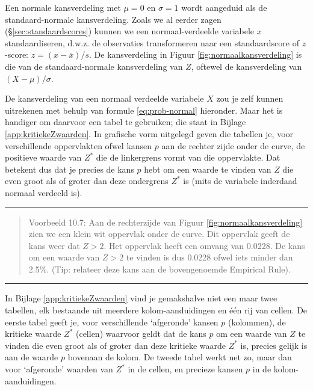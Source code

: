 \documentclass[
]{book}
\begin{document}
Een normale kansverdeling met \(\mu=0\) en \(\sigma=1\) wordt aangeduid als
de standaard-normale kansverdeling. Zoals we al eerder zagen
(§\ref{sec:standaardscores}) kunnen we een normaal-verdeelde
variabele \(x\) standaardiseren, d.w.z. de observaties transformeren naar
een standaardscore of \(z\)-score: \(z = (x-\overline{x})/s\).
De kansverdeling in
Figuur \ref{fig:normaalkansverdeling} is die van de standaard-normale
kansverdeling van \(Z\), oftewel de kansverdeling van \((X-\mu)/\sigma\).

De kansverdeling van een normaal verdeelde variabele \(X\) zou je zelf
kunnen uitrekenen met behulp van formule
\eqref{eq:prob-normal} hieronder. Maar het is handiger om daarvoor
een tabel te gebruiken; die staat in
Bijlage \ref{app:kritiekeZwaarden}.
In grafische vorm uitgelegd geven die tabellen je,
voor verschillende oppervlakten ofwel kansen \(p\) aan de rechter zijde onder de curve,
de positieve waarde van \(Z^*\) die de linkergrens vormt
van die oppervlakte. Dat betekent dus dat je precies de kans \(p\) hebt om
een waarde te vinden van \(Z\) die even groot als of groter dan deze
ondergrens \(Z^*\) is (mits de variabele inderdaad normaal verdeeld is).

\begin{center}\rule{0.5\linewidth}{0.5pt}\end{center}

\begin{quote}
Voorbeeld 10.7: Aan de rechterzijde van Figuur \ref{fig:normaalkansverdeling} zien we een klein wit oppervlak onder de curve. Dit oppervlak geeft de kans weer dat \(Z>2\). Het oppervlak heeft een omvang van 0.0228. De kans om een waarde van \(Z>2\) te vinden is dus 0.0228 ofwel iets minder dan 2.5\%. (Tip: relateer deze kans aan de bovengenoemde Empirical Rule).
\end{quote}

\begin{center}\rule{0.5\linewidth}{0.5pt}\end{center}

In
Bijlage \ref{app:kritiekeZwaarden} vind je gemakshalve niet een maar twee
tabellen, elk bestaande uit meerdere kolom-aanduidingen en één rij van
cellen. De eerste tabel geeft je, voor verschillende `afgeronde' kansen
\(p\) (kolommen), de kritieke waarde \(Z^*\) (cellen) waarvoor geldt dat de
kans \(p\) om een waarde van \(Z\) te vinden die even groot als of groter
dan deze kritieke waarde \(Z^*\) is, precies gelijk is aan de waarde \(p\)
bovenaan de kolom. De tweede tabel werkt net zo, maar dan voor
`afgeronde' waarden van \(Z^*\) in de cellen, en precieze kansen \(p\) in de
kolom-aanduidingen.
\end{document}
